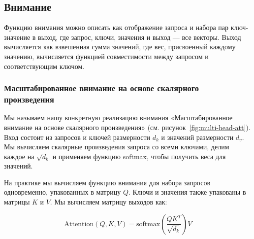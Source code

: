 \documentclass{article}
\begin{document}

\subsection{Внимание} \label{sec:attention}
Функцию внимания можно описать как отображение запроса и набора пар ключ-значение в выход, где запрос, ключи, значения и выход — все векторы. Выход вычисляется как взвешенная сумма значений, где вес, присвоенный каждому значению, вычисляется функцией совместимости между запросом и соответствующим ключом.

\subsubsection{Масштабированное внимание на основе скалярного произведения} \label{sec:scaled-dot-prod}


Мы называем нашу конкретную реализацию внимания «Масштабированное внимание на основе скалярного произведения» (см. рисунок~\ref{fig:multi-head-att}). Вход состоит из запросов и ключей размерности $d_k$ и значений размерности $d_v$. Мы вычисляем скалярные произведения запроса со всеми ключами, делим каждое на $\sqrt{d_k}$ и применяем функцию softmax, чтобы получить веса для значений.

На практике мы вычисляем функцию внимания для набора запросов одновременно, упакованных в матрицу $Q$. Ключи и значения также упакованы в матрицы $K$ и $V$. Мы вычисляем матрицу выходов как:

\begin{equation}
   \mathrm{Attention}(Q, K, V) = \mathrm{softmax}(\frac{QK^T}{\sqrt{d_k}})V
\end{equation}
\end{document}
